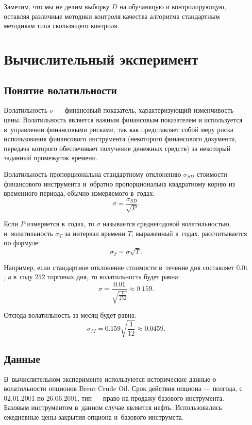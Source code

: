 \documentclass[12pt,a4paper]{amsart}
\begin{document}
Заметим, что мы не делим выборку $D$ на обучающую и контролирующую, оставляя
различные методики контроля качества алгоритма стандартным методикам типа
скользящего контроля.

\section{Вычислительный эксперимент}

\subsection{Понятие волатильности}

Волатильность $\sigma$ --- финансовый показатель, характеризующий
изменчивость цены. Волатильность является важным финансовым показателем
и используется в~управлении финансовыми рисками, так как представляет собой
меру риска использования финансового инструмента (некоторого финансового
документа, передача которого обеспечивает получение денежных средств) за
некоторый заданный промежуток времени.

Волатильность пропорциональна стандартному отклонению $\sigma_{SD}$ стоимости
финансового инструмента и~обратно пропорциональна квадратному корню из
временного периода, обычно измеряемого в~годах:
\[
\sigma = \frac{\sigma_{SD}}{\sqrt{P}}.
\]

Если $P$ измеряется в~годах, то $\sigma$ называется среднегодовой
волатильностью, и~волатильность $\sigma_T$ за интервал времени $T$,
выраженный в~годах, рассчитывается по формуле:
\[
\sigma_T = \sigma \sqrt{T}.
\]

Например, если стандартное отклонение стоимости в~течение дня составляет
$0.01$, а в~году $252$ торговых дня, то волатильность будет равна:
\[
\sigma = \frac{0.01}{\sqrt{\frac{1}{252}}} \approx 0.159.
\]

Отсюда волатильность за месяц будет равна:
\[
\sigma_M = 0.159 \sqrt{\frac{1}{12}} \approx 0.0459.
\]

\subsection{Данные}

В~вычислительном эксперименте используются исторические данные о
волатильности опционов Brent Crude Oil. Срок действия опциона --- полгода,
с 02.01.2001 по 26.06.2001, тип --- право на продажу базового инструмента.
Базовым инструментом в~данном случае является нефть. Использовались
ежедневные цены закрытия опциона и~базового инструмета.
\end{document}
